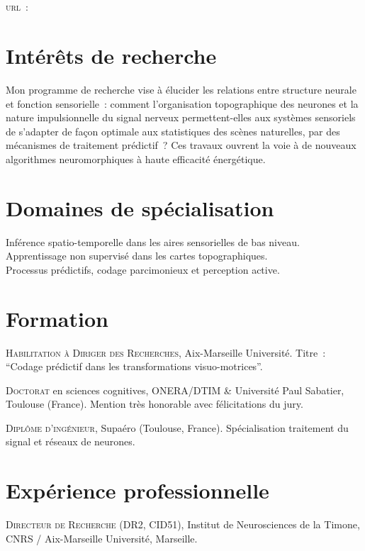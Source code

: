 \documentclass[11pt, a4paper, french]{article}
\newcommand{\years}[1]{\marginnote{\scriptsize #1}}
\begin{document}
\pagestyle{empty}
\reversemarginpar
\textsf{\Large \Author}\\[1cm]
\Address \\[.2cm]
\textsc{url}~: \href{\Website}{\Website}\\

\section*{Intérêts de recherche}
Mon programme de recherche vise à élucider les relations entre structure neurale et fonction sensorielle~: comment l'organisation topographique des neurones et la nature impulsionnelle du signal nerveux permettent-elles aux systèmes sensoriels de s'adapter de façon optimale aux statistiques des scènes naturelles, par des mécanismes de traitement prédictif~? Ces travaux ouvrent la voie à de nouveaux algorithmes neuromorphiques à haute efficacité énergétique.

\section*{Domaines de spécialisation}
Inférence spatio-temporelle dans les aires sensorielles de bas niveau.\\
Apprentissage non supervisé dans les cartes topographiques.\\
Processus prédictifs, codage parcimonieux et perception active.

\section*{Formation}

\noindent\years{2017}\textsc{Habilitation à Diriger des Recherches}, Aix-Marseille Université. Titre~: ``Codage prédictif dans les transformations visuo-motrices''.

\noindent\years{1999--2003}\textsc{Doctorat} en sciences cognitives, ONERA/DTIM \& Université Paul Sabatier, Toulouse (France). Mention très honorable avec félicitations du jury.

\noindent\years{1993--1998}\textsc{Diplôme d'ingénieur}, {\sc Supaéro} (Toulouse, France). Spécialisation traitement du signal et réseaux de neurones.

\section*{Expérience professionnelle}

\noindent\years{2020--\ldots}\textsc{Directeur de Recherche} (DR2, CID51), Institut de Neurosciences de la Timone, CNRS / Aix-Marseille Université, Marseille.
\end{document}
